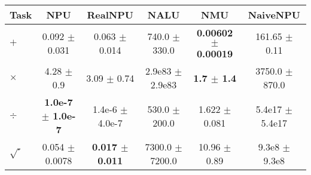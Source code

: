 \begin{tabular}{lccccc}
\toprule
Task & NPU & RealNPU & NALU & NMU & NaiveNPU\\
\midrule
$+$  & 0.092 $\pm$ 0.031 & 0.063 $\pm$ 0.014 &740.0 $\pm$ 330.0 & \textbf{0.00602 $\pm$ 0.00019} & 161.65 $\pm$ 0.11 \\
$\times$ & 4.28 $\pm$ 0.9 & 3.09 $\pm$ 0.74 &2.9e83 $\pm$ 2.9e83 & \textbf{1.7 $\pm$ 1.4} & 3750.0 $\pm$ 870.0 \\
$\div$  & \textbf{1.0e-7 $\pm$ 1.0e-7} & 1.4e-6 $\pm$ 4.0e-7 &530.0 $\pm$ 200.0 & 1.622 $\pm$ 0.081 & 5.4e17 $\pm$ 5.4e17 \\
$\sqrt{\cdot}$ & 0.054 $\pm$ 0.0078 & \textbf{0.017 $\pm$ 0.011} &7300.0 $\pm$ 7200.0 & 10.96 $\pm$ 0.89 & 9.3e8 $\pm$ 9.3e8 \\
\bottomrule
\end{tabular}
